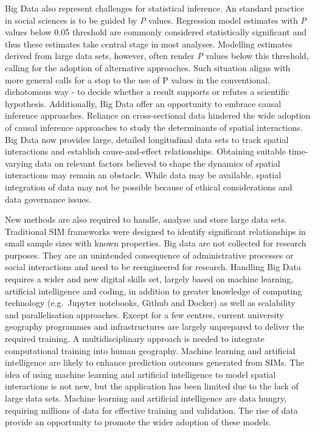 \documentclass[11pt,letterpaper]{article}
\begin{document}
Big Data also represent challenges for statistical inference.
An standard practice in social sciences is to be guided by \emph{P} values.
Regression model estimates with \emph{P} values below 0.05 threshold are commonly considered statistically significant and thus these estimates take central stage in most analyses.
Modelling estimates derived from large data sets, however, often render \emph{P} values below this threshold, calling for the adoption of alternative approaches.
Such situation aligns with more general calls for a stop to the use of P values in the conventional, dichotomous way - to decide whether a result supports or refutes a scientific hypothesis.
Additionally, Big Data offer an opportunity to embrace causal inference approaches.
Reliance on cross-sectional data hindered the wide adoption of causal inference approaches to study the determinants of spatial interactions.
Big Data now provides large, detailed longitudinal data sets to track spatial interactions and establish cause-and-effect relationships.
Obtaining suitable time-varying data on relevant factors believed to shape the dynamics of spatial interactions may remain an obstacle.
While data may be available, spatial integration of data may not be possible because of ethical considerations and data governance issues.

New methods are also required to handle, analyse and store large data sets.
Traditional SIM frameworks were designed to identify significant relationships in small sample sizes with known properties.
Big data are not collected for research purposes.
They are an unintended consequence of administrative processes or social interactions and need to be reengineered for research.
Handling Big Data requires a wider and new digital skills set, largely based on machine learning, artificial intelligence and coding, in addition to greater knowledge of computing technology (e.g.~Jupyter notebooks, Github and Docker) as well as scalability and parallelisation approaches.
Except for a few centres, current university geography programmes and infrastructures are largely unprepared to deliver the required training.
A multidisciplinary approach is needed to integrate computational training into human geography.
Machine learning and artificial intelligence are likely to enhance prediction outcomes generated from SIMs.
The idea of using machine learning and artificial intelligence to model spatial interactions is not new, but the application has been limited due to the lack of large data sets.
Machine learning and artificial intelligence are data hungry, requiring millions of data for effective training and validation.
The rise of data provide an opportunity to promote the wider adoption of these models.
\end{document}
